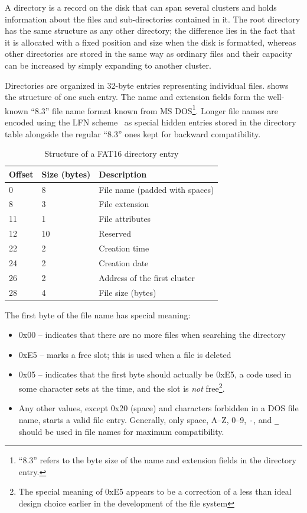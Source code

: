 A directory is a record on the disk that can span several clusters and holds information about the files and sub-directories contained in it. The root directory has the same structure as any other directory; the difference lies in the fact that it is allocated with a fixed position and size when the disk is formatted, whereas other directories are stored in the same way as ordinary files and their capacity can be increased by simply expanding to another cluster.

Directories are organized in 32-byte entries representing individual files.  shows the structure of one such entry. The name and extension fields form the well-known ``8.3'' file name format known from MS DOS\footnote{``8.3'' refers to the byte size of the name and extension fields in the directory entry.}. Longer file names are encoded using the \gls{LFN} scheme~\cite{fat-lfn} as special hidden entries stored in the directory table alongside the regular ``8.3'' ones kept for backward compatibility.

\begin{table}
	\centering
	\begin{tabular}{lll}
		\toprule
		\textbf{Offset} & \textbf{Size (bytes)}  & \textbf{Description}\\
		\midrule
		0 & 8 & File name (padded with spaces) \\
		8 & 3 & File extension \\
		11 & 1 & File attributes \\
		12 & 10 & Reserved \\
		22 & 2 & Creation time \\
		24 & 2 & Creation date \\
		26 & 2 & Address of the first cluster \\
		28 & 4 & File size (bytes) \\
		\bottomrule
	\end{tabular}
	\caption{\label{tab:fat16-dir-entry}Structure of a FAT16 directory entry}
\end{table}

\noindent
The first byte of the file name has special meaning:

\begin{itemize}
	\item 0x00 -- indicates that there are no more files when searching the directory
	\item 0xE5 -- marks a free slot; this is used when a file is deleted
	\item 0x05 -- indicates that the first byte should actually be 0xE5, a code used in some character sets at the time, and the slot is \textit{not} free\footnote{The special meaning of 0xE5 appears to be a correction of a less than ideal design choice earlier in the development of the file system}.
	\item Any other values, except 0x20 (space) and characters forbidden in a DOS file name, starts a valid file entry. Generally, only space, A--Z, 0--9, \verb|-|, and \verb|_| should be used in file names for maximum compatibility.
\end{itemize}


